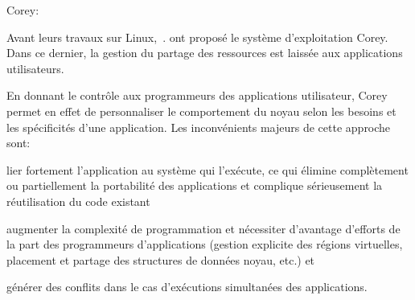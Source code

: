       \begin{paragraph}{Corey:}

        Avant leurs travaux sur Linux,~\citet{boyd2008corey}. ont proposé le
        système d’exploitation Corey. Dans ce dernier, la gestion du partage des
        ressources est laissée aux applications utilisateurs.

        En donnant le contrôle aux programmeurs des applications utilisateur,
        Corey permet en effet de personnaliser le comportement du noyau selon
        les besoins et les spécificités d’une application. Les inconvénients
        majeurs de cette approche sont: \benumline \item lier fortement
        l’application au système qui l’exécute, ce qui élimine complètement ou
        partiellement la portabilité des applications et complique sérieusement
        la réutilisation du code existant \item augmenter la complexité de
        programmation et nécessiter d’avantage d’efforts de la part des
        programmeurs d’applications (gestion explicite des régions virtuelles,
        placement et partage des structures de données noyau, etc.) et \item
        générer des conflits dans le cas d'exécutions simultanées des
        applications\eenumline.

      \end{paragraph}

